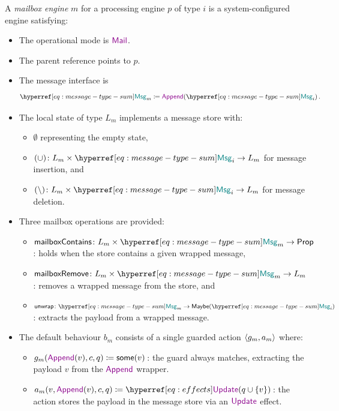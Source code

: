 \documentclass[
  a4paper,        %
  techreport,     %
]{art}
\begin{document}
\begin{definition}\label{def:mailbox-engine}%
A \emph{mailbox engine} $m$ for a processing engine $p$ of type $i$ is a
system-configured engine satisfying:
\begin{itemize}
\item The operational mode is $\mail$.
\item The parent reference points to $p$.
\item The message interface is
\begin{equation}\label{eq:mailbox-engine-message-interface}
  \defequal{
    \msgtype{m}
  }{
    \append(\msgtype{i})
  }\,.
\end{equation}
\item The local state of type $L_m$ implements a message store with:
  \begin{itemize}
  \item $\emptyset$ representing the empty state,
  \item $\typing{(\insertmsgop)}{L_m \times \msgtype{i} \to L_m}$ for
  message insertion, and
  \item $\typing{(\deletemsgop)}{L_m \times \msgtype{i} \to L_m}$ for
  message deletion.
  \end{itemize}
\item Three mailbox operations are provided:
  \begin{itemize}
  \item $\typing{\mathsf{mailboxContains}}{L_m \times \msgtype{m} \to \mathsf{Prop}}$:
  holds when the store contains a given wrapped message,
  \item $\typing{\mathsf{mailboxRemove}}{L_m \times \msgtype{m} \to L_m}$:
  removes a wrapped message from the store, and
  \item $\typing{\mathsf{unwrap}}{\msgtype{m} \to \Option{\msgtype{i}}}$:
  extracts the payload from a wrapped message.
  \end{itemize}
\item The default behaviour $b_m$ consists of a single guarded action
  $ \langle g_m , a_m \rangle $ where:
  \begin{itemize}
  \item $g_m(\append(v), c, q) \coloneqq \some{v}$\,: the guard always
  matches, extracting the payload $v$ from the $\append$ wrapper.
  \item $a_m(v, \append(v), c, q) \coloneqq \update{q \cup \{v\}}$\,: the
  action stores the payload in the message store via an $\ccon{Update}$ effect.
  \end{itemize}
\end{itemize}
\end{definition}
\end{document}
